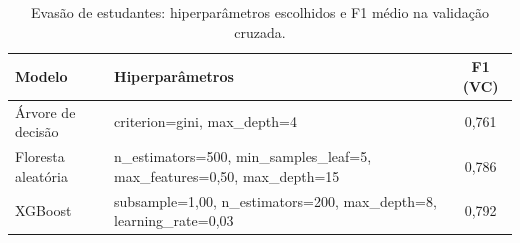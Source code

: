 \begin{table}[!t]
\centering
\caption{Evasão de estudantes: hiperparâmetros escolhidos e F1 médio na validação cruzada.}
\label{tab:estudantes_hiper}
\begin{tabular}{llc}
\hline
Modelo & Hiperparâmetros & F1 (VC) \\
\hline
Árvore de decisão & criterion=gini, max\_depth=4 & 0,761 \\
Floresta aleatória & n\_estimators=500, min\_samples\_leaf=5, max\_features=0,50, max\_depth=15 & 0,786 \\
XGBoost & subsample=1,00, n\_estimators=200, max\_depth=8, learning\_rate=0,03 & 0,792 \\
\hline
\end{tabular}
\end{table}